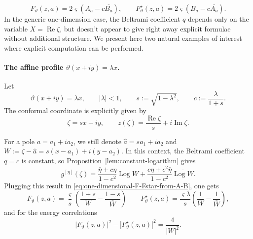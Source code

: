 \documentclass[reqno]{amsart}
\numberwithin{equation}{section}
\theoremstyle{definition}
\theoremstyle{remark}
\renewcommand\Re{\operatorname{Re}}
\renewcommand\Im{\operatorname{Im}}
\providecommand{\Log}{\operatorname{Log}}
\providecommand{\hata}{\widehat a}
\begin{document}
\begin{equation}\label{eq:one-dimensional-F-Fstar-from-A-B}
        F_\vartheta(z,a)=2\varsigma(A_a-c\overline{B_a}),
        \qquad
        F^\star_\vartheta(z,a)=2\varsigma(B_a-c\overline{A_a}).
\end{equation}
In the generic one-dimension case, the Beltrami coefficient $q$ depends only on the variable $X=\Re\zeta$, but doesn't appear to give right away explicit formulae without additional structure. We present here two natural examples of interest where explicit computation can be performed.



\paragraph{\textbf{The affine profile} $\vartheta(x+iy)=\lambda x$.}

Let
\begin{equation}\label{eq:affine-profile}
        \vartheta(x+iy)=\lambda x,
        \qquad |\lambda|<1,
        \qquad s:=\sqrt{1-\lambda^2},
        \qquad c:=\frac{\lambda}{1+s}.
\end{equation}
The conformal coordinate is explicitly given by
\begin{equation}\label{eq:affine-zeta}
        \zeta=sx+iy,
        \qquad
        z(\zeta)=\frac{\Re\zeta}{s}+i\Im\zeta.
\end{equation}

For a pole $a=a_1+ia_2$, we still denote $\hata=sa_1+ia_2$ and
$W:=\zeta-\hata=s(x-a_1)+i(y-a_2)$. In this context, the Beltrami coefficient $q=c$ is constant, so Proposition~\ref{lem:constant-logarithm} gives
\begin{equation*}\label{eq:affine-g-eta}
        g^{[\eta]}(\zeta)
        =\frac{\overline\eta+c\eta}{1-c^2}\Log W
        +\frac{c\eta+c^2\overline\eta}{1-c^2}\overline{\Log W}.
\end{equation*}
Plugging this result in \eqref{eq:one-dimensional-F-Fstar-from-A-B}, one gets
\begin{equation}
        F_\vartheta(z,a)=\frac{\varsigma}{s}\left(
        \frac{1+s}{W}-\frac{1-s}{\overline W}
        \right)
        \qquad
        F^\star_\vartheta(z,a)
        =\frac{\varsigma\lambda}{s}\left(
        \frac{1}{W}-\frac{1}{\overline W}
        \right),
\end{equation}
and for the energy correlations
\begin{equation}\label{eq:affine-energy-scalar}
        |F_\vartheta(z,a)|^2-|F^\star_\vartheta(z,a)|^2
        =\frac{4}{|W|^2}.
\end{equation}
\end{document}
